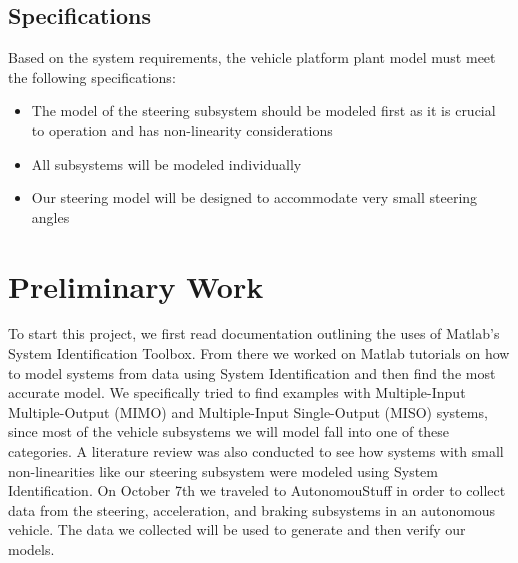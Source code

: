 \documentclass[letterpaper,12pt]{article}   %
\begin{document}
%   


 \subsection{Specifications}
 Based on the system requirements, the vehicle platform plant model must meet the following specifications:
 \begin{itemize}
    \item The model of the steering subsystem should be modeled first as it is crucial to operation and has non-linearity considerations
    \item All subsystems will be modeled individually 
    \item Our steering model will be designed to accommodate very small steering angles
 \end{itemize}

\section{Preliminary Work}
To start this project, we first read documentation outlining the uses of Matlab's System Identification Toolbox. From there we worked on Matlab tutorials on how to model systems from data using System Identification and then find the most accurate model. We specifically tried to find examples with Multiple-Input Multiple-Output (MIMO) and Multiple-Input Single-Output (MISO) systems, since most of the vehicle subsystems we will model fall into one of these categories. A literature review was also conducted to see how systems with small non-linearities like our steering subsystem were modeled using System Identification. On October 7th we traveled to AutonomouStuff in order to collect data from the steering, acceleration, and braking subsystems in an autonomous vehicle. The data we collected will be used to generate and then verify our models. 


\end{document}
